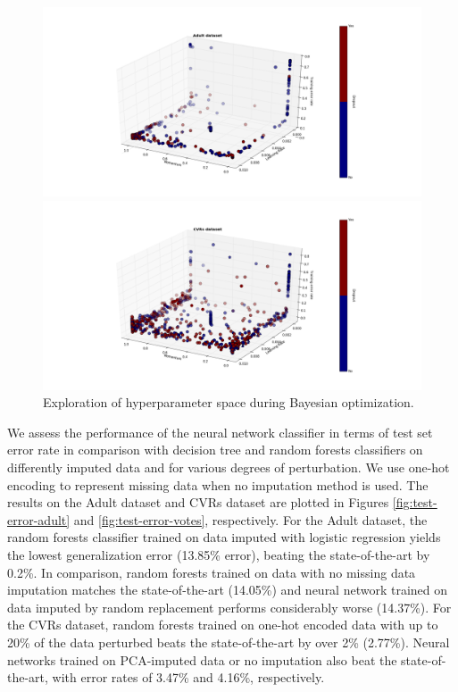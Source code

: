\documentclass[10pt]{book}
\theoremstyle{definition}
\begin{document}
\begin{figure}[h!]
\includegraphics [scale=0.45, center]{../images/params3d_adult.png}\par
\includegraphics [scale=0.45, center]{../images/params3d_votes.png}\par
\caption{\footnotesize Exploration of hyperparameter space during Bayesian optimization.}
   \label{fig:params}
\end{figure}

\par
{}

We assess the performance of the neural network classifier in terms of test set error rate in comparison with decision tree and random forests classifiers on differently imputed data and for various degrees of perturbation.  We use one-hot encoding to represent missing data when no imputation method is used. The results on the Adult dataset and CVRs dataset are plotted in Figures \ref{fig:test-error-adult} and \ref{fig:test-error-votes}, respectively. For the Adult dataset, the random forests classifier trained on data imputed with logistic regression yields the lowest generalization error (13.85\% error), beating the state-of-the-art by 0.2\%. In comparison, random forests trained on data with no missing data imputation matches the state-of-the-art (14.05\%) and neural network trained on data imputed by random replacement performs considerably worse (14.37\%). For the CVRs dataset, random forests trained on one-hot encoded data with up to 20\% of the data perturbed beats the state-of-the-art by over 2\% (2.77\%). Neural networks trained on PCA-imputed data or no imputation also beat the state-of-the-art, with error rates of 3.47\% and 4.16\%, respectively. 
\end{document}
